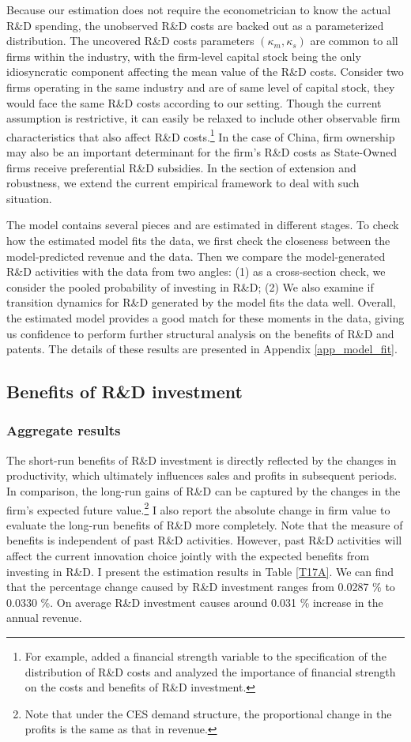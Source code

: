 \documentclass[11pt]{article}
\begin{document}
Because our estimation does not require the econometrician to know the actual R\&D spending, the unobserved R\&D costs are backed out as a parameterized distribution. The uncovered R\&D costs parameters $(\kappa_m, \kappa_s)$ are common to all firms within the industry, with the firm-level capital stock being the only idiosyncratic component affecting the mean value of the R\&D costs. Consider two firms operating in the same industry and are of same level of capital stock, they would face the same R\&D costs according to our setting. Though the current assumption is restrictive, it can easily be relaxed to include other observable firm characteristics that also affect R\&D costs.\footnote{For example, \cite{Peters2016} added a financial strength variable to the specification of the distribution of R\&D costs and analyzed the importance of financial strength on the costs and benefits of R\&D investment.} In the case of China, firm ownership may also be an important determinant for the firm's R\&D costs as State-Owned firms receive preferential R\&D subsidies. In the section of extension and robustness, we extend the current empirical framework to deal with such situation. 

The model contains several pieces and are estimated in different stages. To check how the estimated model fits the data, we first check the closeness between the model-predicted revenue and the data. Then we compare the model-generated R\&D activities with the data from two angles: (1) as a cross-section check, we consider the pooled probability of investing in R\&D; (2) We also examine if transition dynamics for R\&D generated by the model fits the data well. Overall, the estimated model provides a good match for these moments in the data, giving us confidence to perform further structural analysis on the benefits of R\&D and patents. The details of these results are presented in Appendix \ref{app_model_fit}.

\subsection{Benefits of R\&D investment}
\subsubsection{Aggregate results}
The short-run benefits of R\&D investment is directly reflected by the changes in productivity, which ultimately influences sales and profits in subsequent periods. In comparison, the long-run gains of R\&D can be captured by the changes in the firm's expected future value.\footnote{Note that under the CES demand structure, the proportional change in the profits is the same as that in revenue.} I also report the absolute change in firm value to evaluate the long-run benefits of R\&D more completely. Note that the measure of benefits is independent of past R\&D activities. However, past R\&D activities will affect the current innovation choice jointly with the expected benefits from investing in R\&D. I present the estimation results in Table \ref{T17A}. We can find that the percentage change caused by R\&D investment ranges from 0.0287 \% to 0.0330 \%. On average R\&D investment causes around 0.031 \% increase in the annual revenue. 
\end{document}
